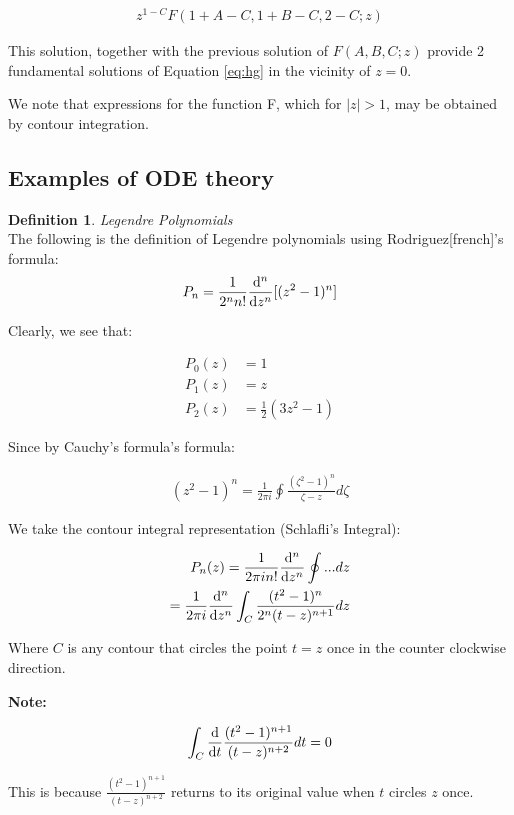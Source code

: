 \documentclass{article}
\theoremstyle{definition}
\newtheorem{definition}{Definition}[section]
\newcommand{\Def}[2]{
\begin{shaded*}
\begin{definition}{\textit{#1}}\\#2\end{definition}
\end{shaded*}
}
\begin{document}
\begin{align*}
z^{1-C} F(1+A-C, 1+B-C, 2-C; z)
\end{align*}

This solution, together with the previous solution of $F(A,B,C;z)$ provide 2 fundamental solutions of Equation \ref{eq:hg} in the vicinity of $z=0$. 

We note that expressions for the function F, which for $|z|>1$, may be obtained by contour integration. 

\subsection{Examples of ODE theory}
\Def{Legendre Polynomials}{
The following is the definition of Legendre polynomials using Rodriguez[french]'s formula:
\begin{align*}
P_n = \frac{1}{2^n n!} \dv{^n}{z^n} [(z^2-1)^n]
\end{align*}

Clearly, we see that:

\begin{align*}
P_0(z) &= 1\\
P_1(z) &= z\\
P_2(z)&= \frac{1}{2}(3z^2-1) 
\end{align*}

}

Since by Cauchy's formula's formula:

\begin{align*}
(z^2-1)^n = \frac{1}{2\pi i }\oint \frac{(\zeta^2-1)^n}{\zeta-z} d\zeta
\end{align*}

We take the contour integral representation (Schlafli's Integral):

\begin{align*}
P_n(z) = \frac{1}{2\pi i n!} \dv{^n}{z^n}\oint ... dz \\ 
= \frac{1}{2\pi i } \dv{^n}{z^n}\int_C \frac{(t^2-1)^n}{2^n(t-z)^{n+1}} dz
\end{align*}

Where $C$ is any contour that circles the point $t=z$ once in the counter clockwise direction.

\textbf{Note:}

\begin{align*}
\int_C \dv{t} \frac{(t^2-1)^{n+1}}{(t-z)^{n+2}} dt = 0
\end{align*}

This is because $\frac{(t^2-1)^{n+1}}{(t-z)^{n+2}}$ returns to its original value when $t$ circles $z$ once.
\end{document}
